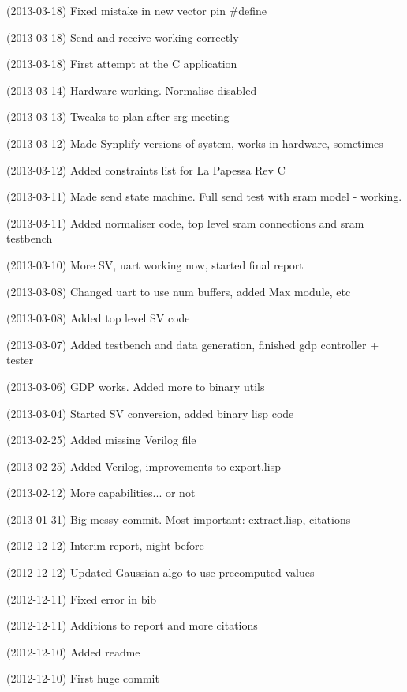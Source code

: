 (2013-03-18) Fixed mistake in new vector pin \#define

(2013-03-18) Send and receive working correctly

(2013-03-18) First attempt at the C application

(2013-03-14) Hardware working. Normalise disabled

(2013-03-13) Tweaks to plan after srg meeting

(2013-03-12) Made Synplify versions of system, works in hardware, sometimes

(2013-03-12) Added constraints list for La Papessa Rev C

(2013-03-11) Made send state machine. Full send test with sram model - working.

(2013-03-11) Added normaliser code, top level sram connections and sram testbench

(2013-03-10) More SV, uart working now, started final report

(2013-03-08) Changed uart to use num buffers, added Max module, etc

(2013-03-08) Added top level SV code

(2013-03-07) Added testbench and data generation, finished gdp controller + tester

(2013-03-06) GDP works. Added more to binary utils

(2013-03-04) Started SV conversion, added binary lisp code

(2013-02-25) Added missing Verilog file

(2013-02-25) Added Verilog, improvements to export.lisp

(2013-02-12) More capabilities... or not

(2013-01-31) Big messy commit. Most important: extract.lisp, citations

(2012-12-12) Interim report, night before

(2012-12-12) Updated Gaussian algo to use precomputed values

(2012-12-11) Fixed error in bib

(2012-12-11) Additions to report and more citations

(2012-12-10) Added readme

(2012-12-10) First huge commit

